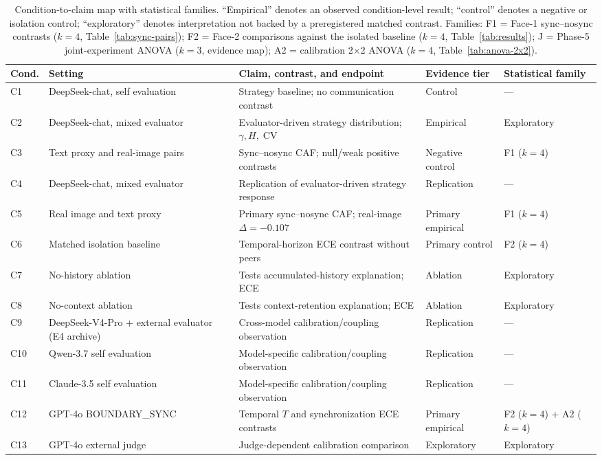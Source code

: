 \documentclass[11pt]{article}
\DeclareMathOperator{\CV}{CV}
\begin{document}
\begin{table}[t]
\centering
\caption{Condition-to-claim map with statistical families. ``Empirical'' denotes an observed condition-level result; ``control'' denotes a negative or isolation control; ``exploratory'' denotes interpretation not backed by a preregistered matched contrast. Families: F1 = Face-1 sync--nosync contrasts ($k{=}4$, Table~\ref{tab:sync-pairs}); F2 = Face-2 comparisons against the isolated baseline ($k{=}4$, Table~\ref{tab:results}); J = Phase-5 joint-experiment ANOVA ($k{=}3$, evidence map); A2 = calibration 2$\times$2 ANOVA ($k{=}4$, Table~\ref{tab:anova-2x2}).}
\label{tab:cond-overview}
\small
\begin{tabularx}{\textwidth}{@{}l p{} X p{} p{}@{}}
\toprule
\textbf{Cond.} & \textbf{Setting} & \textbf{Claim, contrast, and endpoint} & \textbf{Evidence tier} & \textbf{Statistical family} \\
\midrule
C1 & DeepSeek-chat, self evaluation & Strategy baseline; no communication contrast & Control & --- \\
C2 & DeepSeek-chat, mixed evaluator & Evaluator-driven strategy distribution; $\gamma,H,\CV$ & Empirical & Exploratory \\
C3 & Text proxy and real-image pairs & Sync--nosync CAF; null/weak positive contrasts & Negative control & F1 ($k{=}4$) \\
C4 & DeepSeek-chat, mixed evaluator & Replication of evaluator-driven strategy response & Replication & --- \\
C5 & Real image and text proxy & Primary sync--nosync CAF; real-image $\Delta=-0.107$ & Primary empirical & F1 ($k{=}4$) \\
C6 & Matched isolation baseline & Temporal-horizon ECE contrast without peers & Primary control & F2 ($k{=}4$) \\
C7 & No-history ablation & Tests accumulated-history explanation; ECE & Ablation & Exploratory \\
C8 & No-context ablation & Tests context-retention explanation; ECE & Ablation & Exploratory \\
C9 & DeepSeek-V4-Pro + external evaluator (E4 archive) & Cross-model calibration/coupling observation & Replication & --- \\
C10 & Qwen-3.7 self evaluation & Model-specific calibration/coupling observation & Replication & --- \\
C11 & Claude-3.5 self evaluation & Model-specific calibration/coupling observation & Replication & --- \\
C12 & GPT-4o BOUNDARY\_SYNC & Temporal $T$ and synchronization ECE contrasts & Primary empirical & F2 ($k{=}4$) + A2 ($k{=}4$) \\
C13 & GPT-4o external judge & Judge-dependent calibration comparison & Exploratory & Exploratory \\
\bottomrule
\end{tabularx}
\end{table}
\end{document}
